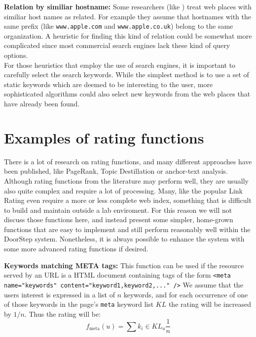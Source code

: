 \documentclass[a4paper]{danarticle}
\theoremstyle{remark}
\begin{document}
    \textbf{Relation by similiar hostname:} Some researchers (like 
    \cite[Link Affiliation]{experts}) 
    treat web places with similiar host names as related. For example they 
    assume that hostnames with the same prefix (like \verb$www.apple.com$ and
    \verb$www.apple.co.uk$) belong to the same organization. A heuristic for 
    finding this kind of relation could be somewhat more complicated since most 
    commercial search engines lack these kind of query options.
    \\
    
    For those heuristics that employ the use of search engines, it is important 
    to carefully select the search keywords. While the simplest method is to use 
    a set of static keywords which are deemed to be interesting to the user, 
    more sophisticated algorithms could also select new keywords from the web 
    places that have already been found.
  \section{Examples of rating functions}
    There is a lot of research on rating functions, and many different 
    approaches have been published, like PageRank\cite{page}, 
    Topic Destillation\cite{kleinberg} or
    anchor-text analysis\cite{chakrabarti}. 
    Although rating functions from 
    the literature may perform well, they are usually also quite complex and 
    require a lot of processing. Many, like the popular Link 
    Rating\cite{page}\cite{kleinberg}
    even require a more or less complete web index, something that is difficult 
    to build and maintain outside a lab enviroment. For this reason we will not 
    discuss those functions here, and instead present some simpler, home-grown 
    functions that are easy to implement and still perform reasonably well 
    within the DoorStep system. Nonetheless, it is always possible to enhance 
    the system with some more advanced rating functions if desired.
  
    \textbf{Keywords matching META tags:} This function can be used if the
    resource served by an URL is a HTML document containing tags of the form
    \verb$<meta name="keywords" content="keyword1,keyword2,..." />$ 
    We assume that the users interest is expressed in a list of $ n $ keywords,
    and for each occurrence of one of those keywords in the page's \verb$meta$
    keyword list $ KL $ the rating will be increased by $ 1/n $. Thus
    the rating will be:
    \[
      f_{\mbox{meta}}(u) = \sum{k_i \in KL_u} \frac{1}{n}
    \]
    \\
    
\end{document}

